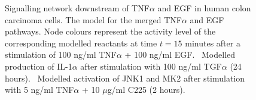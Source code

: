 \begin{figure}[!htpb]
\caption{Signalling network downstream of TNF$\alpha$ and EGF in human colon carcinoma cells.
{\bf \protect{}}
The model for the merged TNF$\alpha$ and EGF pathways. Node colours represent the
activity level of the corresponding modelled reactants at time $t = 15$ minutes after
a stimulation of 100 ng/ml TNF$\alpha$ + 100 ng/ml EGF.
{\bf \protect{}}~Modelled production of IL-1$\alpha$ after stimulation with 100 ng/ml TGF$\alpha$ (24 hours).
{\bf \protect{}}~Modelled activation of JNK1 and MK2 after stimulation with 5 ng/ml TNF$\alpha$ + 10 $\mu$g/ml C225 (2 hours).
}\label{fig:large-model-all}
\end{figure}


